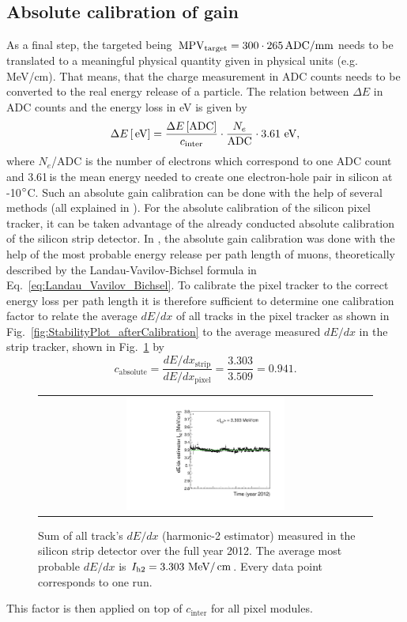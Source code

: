 \subsection*{Absolute calibration of gain}
As a final step, the targeted \mpv being $\,\text{MPV}_{\text{target}}=300 \cdot 265 \,  \text{ADC/mm}$ needs to be translated to a meaningful physical quantity given in physical units (e.g. MeV/cm).
That means, that the charge measurement in ADC counts needs to be converted to the real energy release of a particle.
The relation between $\Delta E$ in ADC counts and the energy loss in eV is given by
\begin{equation*}
\Delta E\,[\,\text{e}\kern-0.06667em\text{V}] = \frac{\Delta E\,[\text{ADC}]}{c_{\text{inter}}} \cdot \frac{N_e}{\text{ADC}} \cdot 3.61 \, \,\text{e}\kern-0.06667em\text{V},
\end{equation*}
where $N_e$/ADC is the number of electrons which correspond to one ADC count and 3.61\,\ev is the  mean energy needed to create one electron-hole pair in silicon at -10$\degree$C.
Such an absolute gain calibration can be done with the help of several methods (all explained in \cite{bib:Quertenmont_2010}).
For the absolute calibration of the silicon pixel tracker, it can be taken advantage of the already conducted absolute calibration of the silicon strip detector.
In \cite{bib:Quertenmont_2010}, the absolute gain calibration was done with the help of the most probable energy release per path length of muons, 
theoretically described by the Landau-Vavilov-Bichsel formula in Eq.~\ref{eq:Landau_Vavilov_Bichsel}.  
To calibrate the pixel tracker to the correct energy loss per path length it is therefore sufficient to determine one calibration factor to relate the average $dE/dx$ of all tracks in the pixel tracker as shown in 
Fig.~\ref{fig:StabilityPlot_afterCalibration} to the average measured $dE/dx$ in the strip tracker, shown in Fig.~\ref{fig:StabilityPlot_Strip} by
\begin{equation*}
c_{\text{absolute}} = \frac{dE/dx_{\text{strip}}}{dE/dx_{\text{pixel}}} = \frac{3.303}{3.509} = 0.941.
\end{equation*}
\begin{figure}[!bt]
  \centering 
  \begin{tabular}{c}
  \includegraphics[width=0.49\textwidth]{figures/analysis/StabilityPlot_Strip_afterCalibration_withoutStepFits_NEW.pdf}
  \end{tabular}
  \caption{Sum of all track's $dE/dx$ (harmonic-2 estimator) measured in the silicon strip detector over the full year 2012. The average most probable $dE/dx$ is $I_{\text{h2}}=3.303\,\,\text{Me}\kern-0.06667em\text{V}/\,\text{cm}$. Every data point corresponds to one run.} 
  \label{fig:StabilityPlot_Strip}
\end{figure}
This factor is then applied on top of $c_{\text{inter}}$ for all pixel modules.


